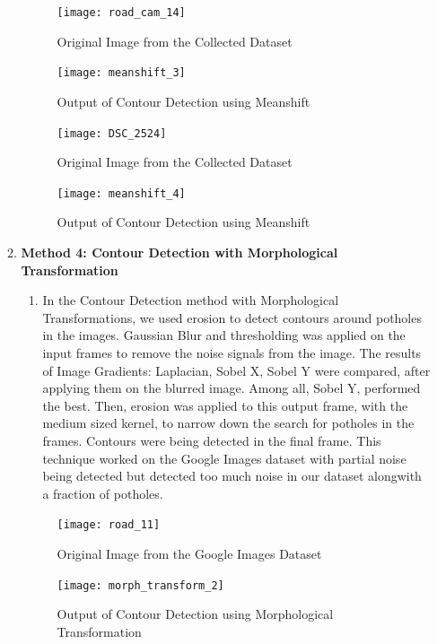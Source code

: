 \begin{enumerate}
\begin{enumerate}
    
    \begin{figure}[ht!]
        \centering
        \texttt{[image: road\_cam\_14]}
        \caption{Original Image from the Collected Dataset}
    \end{figure}

    \begin{figure}[ht!]
        \centering
        \texttt{[image: meanshift\_3]}
        \caption{Output of Contour Detection using Meanshift}
    \end{figure}
    \pagebreak
    
    \begin{figure}[ht!]
        \centering
        \texttt{[image: DSC\_2524]}
        \caption{Original Image from the Collected Dataset}
    \end{figure}

    \begin{figure}[ht!]
        \centering
        \texttt{[image: meanshift\_4]}
        \caption{Output of Contour Detection using Meanshift}
    \end{figure}
    \pagebreak
    
    \item \textbf{Method 4: Contour Detection with Morphological Transformation}
    \begin{enumerate}
        \item In the Contour Detection method with Morphological Transformations, we used erosion to detect contours around potholes in the images. Gaussian Blur and thresholding was applied on the input frames to remove the noise signals from the image. The results of Image Gradients: Laplacian, Sobel X, Sobel Y were compared, after applying them on the blurred image. Among all, Sobel Y, performed the best. Then, erosion was applied to this output frame, with the medium sized kernel, to narrow down the search for potholes in the frames. Contours were being detected in the final frame. This technique worked on the Google Images dataset with partial noise being detected but detected too much noise in our dataset alongwith a fraction of potholes.
    \end{enumerate}
    \begin{figure}[ht!]
        \centering
        \texttt{[image: road\_11]}
        \caption{Original Image from the Google Images Dataset}
    \end{figure}

    \begin{figure}[ht!]
        \centering
        \texttt{[image: morph\_transform\_2]}
        \caption{Output of Contour Detection using Morphological Transformation}
    \end{figure}
    \pagebreak
    

\end{enumerate}
\end{enumerate}

